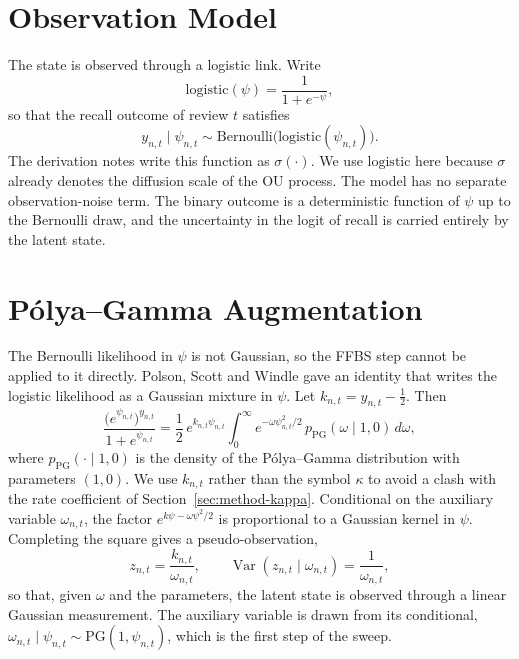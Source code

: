 \section{Observation Model}
\label{sec:method-observation}

The state is observed through a logistic link. Write
\begin{equation}\label{eq:logistic}
  \mathrm{logistic}(\psi) = \frac{1}{1+e^{-\psi}},
\end{equation}
so that the recall outcome of review $t$ satisfies
\begin{equation}\label{eq:obs}
  y_{n,t} \mid \psi_{n,t} \sim \mathrm{Bernoulli}\bigl(\mathrm{logistic}(\psi_{n,t})\bigr).
\end{equation}
The derivation notes write this function as $\sigma(\cdot)$. We use
$\mathrm{logistic}$ here because $\sigma$ already denotes the diffusion scale of the OU process.
The model has no separate observation-noise term. The binary outcome is a deterministic function of
$\psi$ up to the Bernoulli draw, and the uncertainty in the logit of recall is carried entirely by the
latent state.

\section{P\'olya--Gamma Augmentation}
\label{sec:method-pg}

The Bernoulli likelihood in $\psi$ is not Gaussian, so the FFBS step cannot be applied to it
directly. Polson, Scott and Windle \cite{polson2013pg} gave an identity that writes the logistic
likelihood as a Gaussian mixture in $\psi$. Let $k_{n,t} = y_{n,t} - \tfrac{1}{2}$. Then
\begin{equation}\label{eq:pg-identity}
  \frac{\bigl(e^{\psi_{n,t}}\bigr)^{y_{n,t}}}{1+e^{\psi_{n,t}}}
  = \frac{1}{2}\,e^{k_{n,t}\psi_{n,t}}
  \int_0^\infty e^{-\omega\psi_{n,t}^2/2}\,p_{\mathrm{PG}}(\omega \mid 1, 0)\,d\omega,
\end{equation}
where $p_{\mathrm{PG}}(\cdot \mid 1, 0)$ is the density of the P\'olya--Gamma distribution with
parameters $(1,0)$. We use $k_{n,t}$ rather than the symbol $\kappa$ to avoid a clash with the rate
coefficient of Section~\ref{sec:method-kappa}. Conditional on the auxiliary variable
$\omega_{n,t}$, the factor $e^{k\psi - \omega\psi^2/2}$ is proportional to a Gaussian kernel in
$\psi$. Completing the square gives a pseudo-observation,
\begin{equation}\label{eq:pseudo}
  z_{n,t} = \frac{k_{n,t}}{\omega_{n,t}}, \qquad \operatorname{Var}(z_{n,t}\mid \omega_{n,t}) = \frac{1}{\omega_{n,t}},
\end{equation}
so that, given $\omega$ and the parameters, the latent state is observed through a linear Gaussian
measurement. The auxiliary variable is drawn from its conditional,
$\omega_{n,t} \mid \psi_{n,t} \sim \mathrm{PG}(1, \psi_{n,t})$, which is the first step of the sweep.

